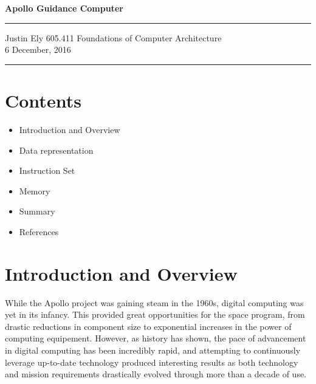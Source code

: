 \documentclass[a4paper,11pt]{article}
\begin{document}
\begin{flushright}

\vspace{1.1cm}

{\bf\Huge Apollo Guidance Computer}

\rule{0.25\linewidth}{0.5pt}


\vspace{0.5cm}
Justin Ely
\linebreak
\newline
\footnotesize{605.411 Foundations of Computer Architecture \\}
\vspace{0.1cm}
6 December, 2016
\end{flushright}

\noindent\rule{\linewidth}{1.0pt}



\section{Contents}
\begin{itemize}
\item Introduction and Overview %
\item Data representation
\item Instruction Set
\item Memory
\item Summary
\item References
\end{itemize}


\section{Introduction and Overview}

While the Apollo project was gaining steam in the 1960s, digital computing was yet in its infancy.  This provided great opportunities for the space program, from drastic reductions in component size to exponential increases in the power of computing equipement.  However, as history has shown, the pace of advancement in digital computing has been incredibly rapid, and attempting to continuously leverage up-to-date technology produced interesting results as both technology and mission requirements drastically evolved through more than a decade of use.  
\end{document}
